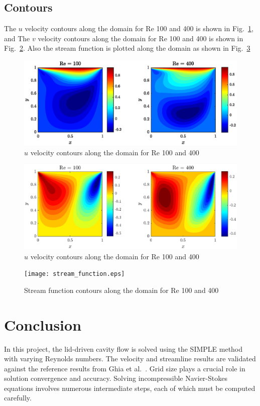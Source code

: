 \documentclass{article}
\numberwithin{equation}{section}
\numberwithin{figure}{section}
\begin{document}
\subsection{Contours}
The $u$ velocity contours along the domain for Re 100 and 400 is shown in Fig.~\ref{fig:u_velocity}, and  The $v$ velocity contours along the domain for Re 100 and 400 is shown in Fig.~\ref{fig:v_velocity}. Also the stream function is plotted along the domain as shown in Fig.~\ref{fig:stream_function}
\begin{figure}
    \centering
    \includegraphics[trim=60 0 60 0, clip]{u_velocity.eps}
    \caption{$u$ velocity contours along the domain for Re 100 and 400}
    \label{fig:u_velocity}
\end{figure}
\begin{figure}
    \centering
    \includegraphics[trim=60 0 60 0, clip]{v_velocity.eps}
    \caption{$u$ velocity contours along the domain for Re 100 and 400}
    \label{fig:v_velocity}
\end{figure}
\begin{figure}
    \centering
    \texttt{[image: stream\_function.eps]}
    \caption{Stream function contours along the domain for Re 100 and 400}
    \label{fig:stream_function}
\end{figure}



\section{Conclusion}
In this project, the lid-driven cavity flow is solved using the SIMPLE method with varying Reynolds numbers. The velocity and streamline results are validated against the reference results from Ghia et al.~\cite{ghia1982high}. Grid size plays a crucial role in solution convergence and accuracy. Solving incompressible Navier-Stokes equations involves numerous intermediate steps, each of which must be computed carefully.
\end{document}
